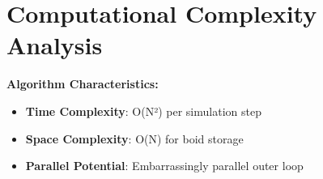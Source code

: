 \section{Computational Complexity Analysis}

\textbf{Algorithm Characteristics:}
\begin{itemize}
    \item \textbf{Time Complexity}: O(N²) per simulation step
    \item \textbf{Space Complexity}: O(N) for boid storage
    \item \textbf{Parallel Potential}: Embarrassingly parallel outer loop
\end{itemize}